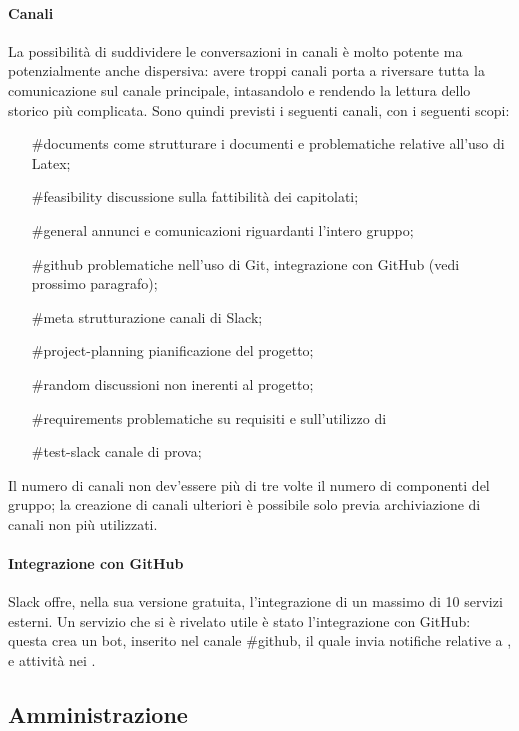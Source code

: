 \paragraph{Canali} La possibilità di suddividere le conversazioni in canali è molto potente ma potenzialmente anche dispersiva: avere troppi canali porta a riversare tutta la comunicazione sul canale principale, intasandolo e rendendo la lettura dello storico più complicata. Sono quindi previsti i seguenti canali, con i seguenti scopi:
\begin{itemize}
	\item[\#documents] come strutturare i documenti e problematiche relative all'uso di Latex;
	\item[\#feasibility] discussione sulla fattibilità dei capitolati;
	\item[\#general] annunci e comunicazioni riguardanti l'intero gruppo;
	\item[\#github] problematiche nell'uso di Git, integrazione con GitHub (vedi prossimo paragrafo);
	\item[\#meta] strutturazione canali di Slack;
	\item[\#project-planning] pianificazione del progetto;
	\item[\#random] discussioni non inerenti al progetto;
	\item[\#requirements] problematiche su requisiti e sull'utilizzo di 
	\item[\#test-slack] canale di prova;
\end{itemize}
Il numero di canali non dev'essere più di tre volte il numero di componenti del gruppo; la creazione di canali ulteriori è possibile solo previa archiviazione di canali non più utilizzati.
\paragraph{Integrazione con GitHub} Slack offre, nella sua versione gratuita, l'integrazione di un massimo di 10 servizi esterni. Un servizio che si è rivelato utile è stato l'integrazione con GitHub: questa crea un bot, inserito nel canale \#github, il quale invia notifiche relative a ,  e attività nei .



\subsection{Amministrazione}

